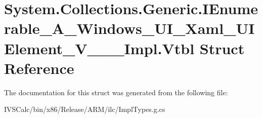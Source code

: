 \hypertarget{struct_system_1_1_collections_1_1_generic_1_1_i_enumerable___a___windows___u_i___xaml___u_i_element___v_______impl_1_1_vtbl}{}\section{System.\+Collections.\+Generic.\+I\+Enumerable\+\_\+\+A\+\_\+\+Windows\+\_\+\+U\+I\+\_\+\+Xaml\+\_\+\+U\+I\+Element\+\_\+\+V\+\_\+\+\_\+\+\_\+\+Impl.\+Vtbl Struct Reference}
\label{struct_system_1_1_collections_1_1_generic_1_1_i_enumerable___a___windows___u_i___xaml___u_i_element___v_______impl_1_1_vtbl}


The documentation for this struct was generated from the following file\+:\begin{DoxyCompactItemize}
\item 
I\+V\+S\+Calc/bin/x86/\+Release/\+A\+R\+M/ilc/Impl\+Types.\+g.\+cs\end{DoxyCompactItemize}
